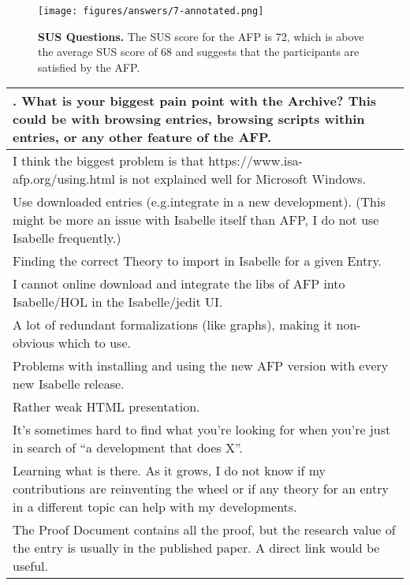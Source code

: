 \documentclass[bsc,frontabs,oneside,singlespacing,parskip,deptreport,logo]{infthesis}
\begin{document}
\begin{figure}[h!]
    \centering
    \texttt{[image: figures/answers/7-annotated.png]}
    \caption{\textbf{SUS Questions.} The SUS score for the AFP is 72, which is above the average SUS score of 68 and suggests that the participants are satisfied by the AFP\@.}
    \label{fig:sus}
\end{figure}

\begin{table}[h!]
\centering
{}
\begin{tabularx}{\textwidth}{X}
{\sf 8. What is your biggest pain point with the Archive? This could be with browsing entries, browsing scripts within entries, or any other feature of the AFP\@.}
\vspace{0.3cm}\\ 
\hline
\footnotesize
I think the biggest problem is that https://www.isa-afp.org/using.html is not explained well for Microsoft Windows.\\
\footnotesize
Use downloaded entries (e.g.integrate in a new development).  (This might be more an issue with Isabelle itself than AFP, I do not use Isabelle frequently.)\\
\footnotesize
Finding the correct Theory to import in Isabelle for a given Entry.\\
\footnotesize
I cannot online download and integrate the libs of AFP into Isabelle/HOL in the Isabelle/jedit UI.\\
\footnotesize
A lot of redundant formalizations (like graphs), making it non-obvious which to use.\\
\footnotesize
Problems with installing and using the new AFP version with every new Isabelle release.\\
\footnotesize
Rather weak HTML presentation.\\
\footnotesize
It's sometimes hard to find what you're looking for when you're just in search of ``a development that does X''.\\
\footnotesize
Learning what is there. As it grows, I do not know if my contributions are reinventing the wheel or if any theory for an entry in a different topic can help with my developments.\\
\footnotesize
The Proof Document contains all the proof, but the research value of the entry is usually in the published paper. A direct link would be useful.\\

\end{tabularx}
\end{table}
\end{document}
